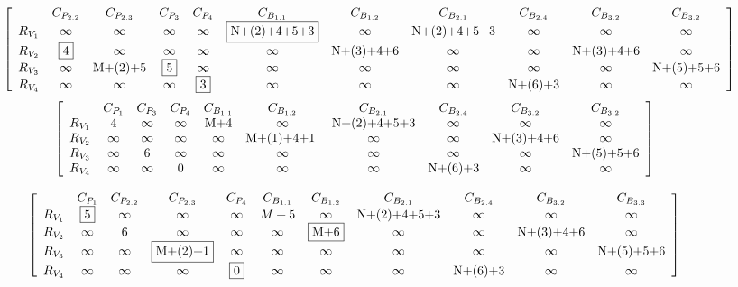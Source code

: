 \begin{figure*}
  \centering
 \begin{equation*}
\left[ {\begin{array}{*{20}{c}}
&C_{P_{2.2}}&C_{P_{2.3}}&C_{P_3}&C_{P_4}&C_{B_{1.1}}&C_{B_{1.2}}&C_{B_{2.1}}&C_{B_{2.4}}&C_{B_{3.2}}&C_{B_{3.2}}\\
{R_{V_1}}&\infty&\infty&\infty&\infty&\fbox{N+(2)+4+5+3}&\infty&${N+(2)+4+5+3}$&\infty&\infty&\infty\\
R_{V_2}&\fbox{4}&\infty&\infty&\infty&\infty&${N+(3)+4+6}$&\infty&\infty&${N+(3)+4+6}$&\infty\\
R_{V_3}&\infty&${M+(2)+5}$&\fbox{5}&\infty&\infty&\infty&\infty&\infty&\infty&${N+(5)+5+6}$\\
R_{V_4}&\infty&\infty&\infty&\fbox{3}&\infty&\infty&\infty&${N+(6)+3}$&\infty&\infty\\
\end{array}} \right]
\end{equation*}
 \begin{equation*}
\left[ {\begin{array}{*{20}{c}}
&C_{P_{1}}&C_{P_3}&C_{P_4}&C_{B_{1.1}}&C_{B_{1.2}}&C_{B_{2.1}}&C_{B_{2.4}}&C_{B_{3.2}}&C_{B_{3.2}}\\
{R_{V_1}}&4&\infty&\infty&${M+4}$&\infty&$N+(2)+4+5+3$&\infty&\infty&\infty\\
R_{V_2}&\infty&\infty&\infty&\infty&${M+(1)+4+1} $&\infty&\infty&${N+(3)+4+6}$&\infty\\
R_{V_3}&\infty&6&\infty&\infty&\infty&\infty&\infty&\infty&$N+(5)+5+6$\\
R_{V_4}&\infty&\infty&0&\infty&\infty&\infty&$N+(6)+3$&\infty&\infty\\
\end{array}} \right]
\end{equation*}

 \begin{equation*}
\left[ {\begin{array}{*{20}{c}}
&C_{P_{1}}&C_{P_{2.2}}&C_{P_{2.3}}&C_{P_4}&C_{B_{1.1}}&C_{B_{1.2}}&C_{B_{2.1}}&C_{B_{2.4}}&C_{B_{3.2}}&C_{B_{3.3}}\\
R_{V_1}&\fbox{5}&\infty&\infty&\infty&M+5&\infty&${N+(2)+4+5+3}$&\infty&\infty&\infty\\
R_{V_2}&\infty&\mbox{6}&\infty&\infty&\infty&\fbox{M+6}&\infty&\infty&${N+(3)+4+6}$&\infty\\
R_{V_3}&\infty&\infty&\fbox{M+(2)+1}&\infty&\infty&\infty&\infty&\infty&\infty&${N+(5)+5+6}$\\
R_{V_4}&\infty&\infty&\infty&\fbox{0}&\infty&\infty&\infty&${N+(6)+3}$&\infty&\infty\\
\end{array}} \right]
\end{equation*}
\end{figure*}
